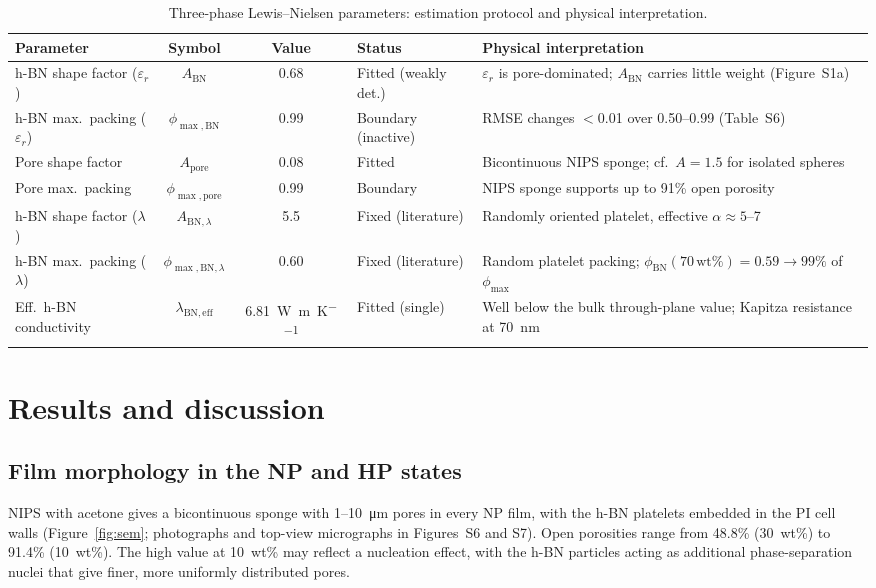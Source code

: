 \documentclass[preprint,a4paper]{elsarticle}
\newcommand{\eps}{\ensuremath{\varepsilon_r}}   %
\newcommand{\lam}{\ensuremath{\lambda}}
\newcommand{\phimax}{\ensuremath{\phi_{\max}}}
\newcommand{\phiBN}{\ensuremath{\phi_{\mathrm{BN}}}}
\newcommand{\Apore}{\ensuremath{A_{\mathrm{pore}}}}
\newcommand{\ABN}{\ensuremath{A_{\mathrm{BN}}}}
\newcommand{\lamBN}{\ensuremath{\lambda_{\mathrm{BN,eff}}}}
\begin{document}
\begin{table}[htbp]
\centering
\caption{Three-phase Lewis--Nielsen parameters: estimation protocol and physical interpretation.}
\label{tab:params}
\footnotesize
\begin{tabular}{@{}p{3.0cm}ccp{2.5cm}p{4.3cm}@{}}
\toprule
Parameter & Symbol & Value & Status & Physical interpretation \\
\midrule
h-BN shape factor (\eps) & \ABN & 0.68 & Fitted (weakly det.) & \eps{} is pore-dominated; \ABN{} carries little weight (Figure~S1a) \\
h-BN max.\ packing (\eps) & $\phi_{\max,\mathrm{BN}}$ & 0.99 & Boundary (inactive) & RMSE changes $<$0.01 over 0.50--0.99 (Table~S6) \\
Pore shape factor & \Apore & 0.08 & Fitted & Bicontinuous NIPS sponge; cf.\ $A=1.5$ for isolated spheres \\
Pore max.\ packing & $\phi_{\max,\mathrm{pore}}$ & 0.99 & Boundary & NIPS sponge supports up to 91\% open porosity \\
h-BN shape factor (\lam) & $A_{\mathrm{BN},\lambda}$ & 5.5 & Fixed (literature) & Randomly oriented platelet, effective $\alpha \approx 5$--7 \\
h-BN max.\ packing (\lam) & $\phi_{\max,\mathrm{BN},\lambda}$ & 0.60 & Fixed (literature) & Random platelet packing; $\phiBN(70\,\mathrm{wt\%})=0.59 \to 99\%$ of \phimax \\
Eff.\ h-BN conductivity & \lamBN & \SI{6.81}{\watt\per\meter\per\kelvin} & Fitted (single) & Well below the bulk through-plane value; Kapitza resistance at \SI{70}{\nm} \\
\bottomrule
\end{tabular}
\end{table}

\section{Results and discussion}
\label{sec:results}

\subsection{Film morphology in the NP and HP states}
\label{sec:morphology}
NIPS with acetone gives a bicontinuous sponge with 1--\SI{10}{\micro\meter} pores in every NP film, with the h-BN platelets embedded in the PI cell walls (Figure~\ref{fig:sem}; photographs and top-view micrographs in Figures~S6 and S7). Open porosities range from 48.8\% (30~wt\%) to 91.4\% (10~wt\%). The high value at 10~wt\% may reflect a nucleation effect, with the h-BN particles acting as additional phase-separation nuclei that give finer, more uniformly distributed pores.
\end{document}
